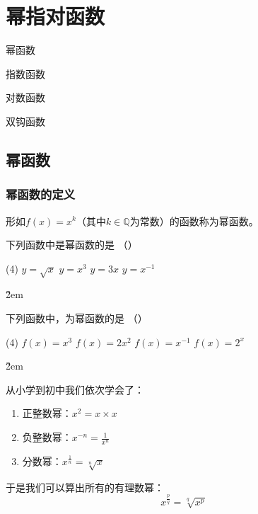 \chapter{幂指对函数}
\begin{introduction}
    \item 幂函数
    \item 指数函数
    \item 对数函数
    \item 双钩函数
\end{introduction}

\section{幂函数}

\subsection{幂函数的定义}

\begin{definition}[幂函数]
    形如$f(x)=x^k$（其中$k\in \mathbb{Q}$为常数）的函数称为幂函数。
\end{definition}

\begin{example}
    下列函数中是幂函数的是 （\qquad）
    \begin{tasks}(4)
        \task $y=\sqrt{x}$
        \task $y=x^3$
        \task $y=3 x$
        \task $y=x^{-1}$
    \end{tasks}
\end{example}

\v{2em}

\begin{example}
    下列函数中，为幂函数的是 （\qquad）
    \begin{tasks}(4)
        \task $f(x)=x^3$
        \task $f(x)=2 x^2$
        \task $f(x)=x^{-1}$
        \task $f(x)=2^x$
    \end{tasks}
\end{example}

\v{2em}

\begin{note}[幂运算]
    从小学到初中我们依次学会了：
    \begin{enumerate}
        \item     正整数幂：$x^2 = x\times x$
        \item     负整数幂：$x^{-n} = \frac{1}{x^n}$
        \item     分数幂：$x^{\frac{1}{n}} = \sqrt[n]{x}$
    \end{enumerate}
    于是我们可以算出所有的有理数幂：$$x^{\frac{p}{q}} = \sqrt[q]{x^p}$$
\end{note}

